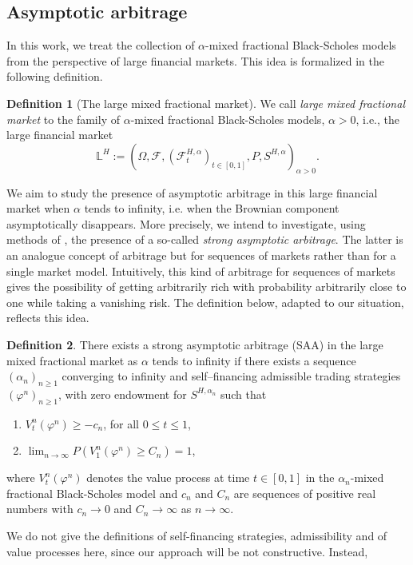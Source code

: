 \documentclass[reqno,a4paper]{amsart}
\theoremstyle{plain}
\theoremstyle{definition}
\newtheorem{definition}{Definition}
\theoremstyle{plain}
\theoremstyle{plain}
\theoremstyle{plain}
\begin{document}
\subsection{Asymptotic arbitrage}
In this work, we treat the collection of $\alpha$-mixed fractional Black-Scholes models from the perspective of large financial markets. This idea is formalized in the following definition.
\begin{definition}[The large mixed fractional market]
We call \textit{large mixed fractional market} to the family of $\alpha$-mixed fractional Black-Scholes models, $\alpha>0$, i.e.,  the large financial market $${{\mathbb L}}^H:=\left(\Omega,{{\mathcal F}},({{\mathcal F}}_t^{H,\alpha})_{t\in[0,1]},P,S^{H,\alpha}\right)_{\alpha>0}.$$
 \end{definition}
We aim to study the presence of asymptotic arbitrage in this large financial market when $\alpha$ tends to infinity, i.e. when the Brownian component asymptotically disappears. More precisely, we intend to investigate, using methods of \cite{Kakra}, the presence of a so-called \textit{strong asymptotic arbitrage}. The latter is an analogue concept of arbitrage but for sequences of markets rather than for a single market model. Intuitively, this kind of arbitrage for sequences of markets gives the possibility of getting arbitrarily rich with probability arbitrarily close to one while taking a vanishing risk. The definition below, adapted to our situation, reflects this idea.
\begin{definition}\label{SAA}
There exists a strong asymptotic arbitrage (SAA) in the large mixed fractional market as $\alpha$ tends to infinity if there exists a sequence $(\alpha_n)_{n\geq 1}$ converging to infinity and self--financing admissible trading strategies $({\varphi}^n)_{n\geq 1}$, with zero endowment for $S^{H,\alpha_n}$ such that
\begin{enumerate}
\item $V_t^n({\varphi}^n)\geq-c_n$, for all $0\leq t\leq 1$,
\item $\lim_{n\to\infty}P(V_1^n({\varphi}^n)\geq C_n)=1$,
\end{enumerate}
where $V_t^n({\varphi}^n)$ denotes the value process at time $t\in[0,1]$ in the $\alpha_n$-mixed fractional Black-Scholes model and $c_n$ and $C_n$ are sequences of positive real numbers with $c_n\to0$ and $C_n\to\infty$ as $n\to\infty$.
\end{definition}
We do not give the definitions of self-financing strategies, admissibility and of value processes here, since our approach will be not constructive. Instead,
\end{document}
